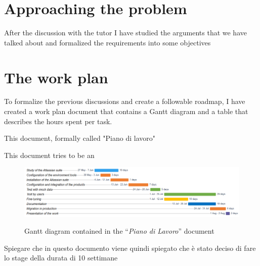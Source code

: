 \section{Approaching the problem}

	After the discussion with the tutor I have studied the arguments that we have talked about and formalized the requirements into some objectives

\section{The work plan}

	To formalize the previous discussions and create a followable roadmap, I have created a work plan document that contains a Gantt diagram and a table that describes the hours spent per task.
	
	This document, formally called "Piano di lavoro"
	
	This document tries to be an
	
	\begin{figure}[H]
		\centering
		\includegraphics[width=1.1\textwidth]{resources/work_plan_gantt}\\
		\caption{Gantt diagram contained in the ``\textit{Piano di Lavoro}'' document}
	\end{figure}

	Spiegare che in questo documento viene quindi spiegato che è stato deciso di fare lo stage della durata di 10 settimane


